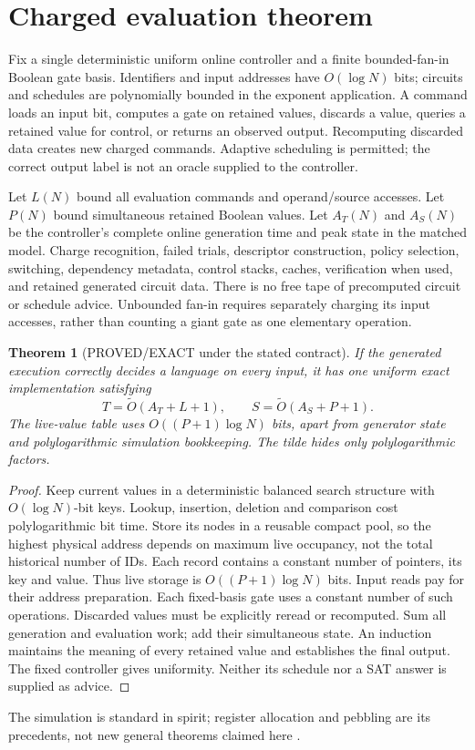 \documentclass[11pt]{article}
\newtheorem{theorem}{Theorem}
\begin{document}
\section{Charged evaluation theorem}
Fix a single deterministic uniform online controller and a finite bounded-fan-in Boolean gate basis. Identifiers and input addresses have $O(\log N)$ bits; circuits and schedules are polynomially bounded in the exponent application. A command loads an input bit, computes a gate on retained values, discards a value, queries a retained value for control, or returns an observed output. Recomputing discarded data creates new charged commands. Adaptive scheduling is permitted; the correct output label is not an oracle supplied to the controller.

Let $L(N)$ bound all evaluation commands and operand/source accesses. Let $P(N)$ bound simultaneous retained Boolean values. Let $A_T(N)$ and $A_S(N)$ be the controller's complete online generation time and peak state in the matched model. Charge recognition, failed trials, descriptor construction, policy selection, switching, dependency metadata, control stacks, caches, verification when used, and retained generated circuit data. There is no free tape of precomputed circuit or schedule advice. Unbounded fan-in requires separately charging its input accesses, rather than counting a giant gate as one elementary operation.

\begin{theorem}[PROVED/EXACT under the stated contract]
If the generated execution correctly decides a language on every input, it has one uniform exact implementation satisfying
\[
T=\widetilde O(A_T+L+1),\qquad S=\widetilde O(A_S+P+1).
\tag{1}
\]
The live-value table uses $O((P+1)\log N)$ bits, apart from generator state and polylogarithmic simulation bookkeeping. The tilde hides only polylogarithmic factors.
\end{theorem}
\begin{proof}
Keep current values in a deterministic balanced search structure with $O(\log N)$-bit keys. Lookup, insertion, deletion and comparison cost polylogarithmic bit time. Store its nodes in a reusable compact pool, so the highest physical address depends on maximum live occupancy, not the total historical number of IDs. Each record contains a constant number of pointers, its key and value. Thus live storage is $O((P+1)\log N)$ bits. Input reads pay for their address preparation. Each fixed-basis gate uses a constant number of such operations. Discarded values must be explicitly reread or recomputed. Sum all generation and evaluation work; add their simultaneous state. An induction maintains the meaning of every retained value and establishes the final output. The fixed controller gives uniformity. Neither its schedule nor a SAT answer is supplied as advice.
\end{proof}
The simulation is standard in spirit; register allocation and pebbling are its precedents, not new general theorems claimed here \cite{sethi,hong}.
\end{document}

